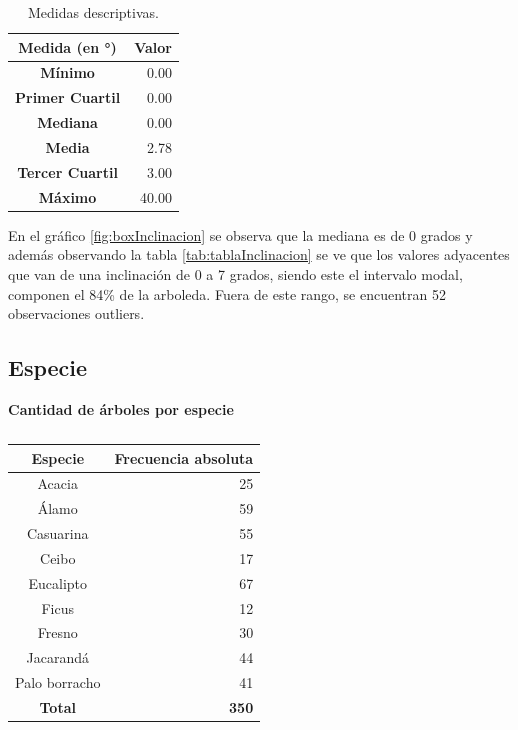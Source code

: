 \documentclass[11pt]{article}
\begin{document}
\newpage

\begin{table}[h!]
  \begin{center}
    \begin{tabular}{| c | r |}
      \hline
      \textbf{Medida (en °)} & \textbf{Valor} \\ \hline
      \textbf{Mínimo} & 0.00 \\ \hline
      \textbf{Primer Cuartil} & 0.00 \\ \hline
      \textbf{Mediana} & 0.00 \\ \hline
      \textbf{Media} & 2.78 \\ \hline
      \textbf{Tercer Cuartil} & 3.00 \\ \hline
      \textbf{Máximo} & 40.00 \\ \hline
    \end{tabular}
    \caption{Medidas descriptivas.}
    \label{tab:descripInclinacion}
  \end{center}
\end{table}

\begin{justify}
  En el gráfico \ref{fig:boxInclinacion} se observa que la mediana
  es de 0 grados y además observando la tabla \ref{tab:tablaInclinacion}
  se ve que los valores adyacentes que van de una inclinación de 0 a 7 grados,
  siendo este el intervalo modal, componen el 84\% de la arboleda.
  Fuera de este rango, se encuentran 52 observaciones outliers.
\end{justify}


\subsection{Especie}

\begin{table}[h!]
  \begin{center}
    \caption*{\textbf{Cantidad de árboles por especie}}
    \begin{tabular}{| c | r |}
      \hline
      \textbf{Especie} & \textbf{Frecuencia absoluta} \\ \hline
      Acacia & 25 \\ \hline
      Álamo & 59 \\ \hline
      Casuarina & 55 \\ \hline
      Ceibo & 17 \\ \hline
      Eucalipto & 67 \\ \hline
      Ficus & 12 \\ \hline
      Fresno & 30 \\ \hline
      Jacarandá & 44 \\ \hline
      Palo borracho & 41 \\ \hline
      \textbf{Total} & \textbf{350} \\ \hline
    \end{tabular}
    \caption{}
    \label{tab:tablaEspecie}
  \end{center}
\end{table}
\end{document}
